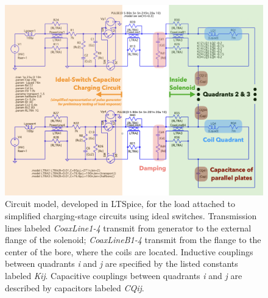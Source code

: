 \begin{refsection}
        \begin{figure}
            \centering
            \includegraphics[width=\textwidth]{Figures/muEDM/Pulser/PulserModelJan2024.png}
            \caption[muEDM: kicker circuit in LTSpice]{Circuit model, developed in LTSpice, for the load attached to simplified charging-stage circuits using ideal switches. Transmission lines labeled \textit{CoaxLine1-4} transmit from generator to the external flange of the solenoid; \textit{CoaxLineB1-4} transmit from the flange to the center of the bore, where the coils are located. Inductive couplings between quadrants \textit{i} and \textit{j} are specified by the listed constants labeled \textit{Kij}. Capacitive couplings between quadrants \textit{i} and \textit{j} are described by capacitors labeled \textit{CQij}.}
        \label{fig:circuit}
        \end{figure}
        

\end{refsection}
